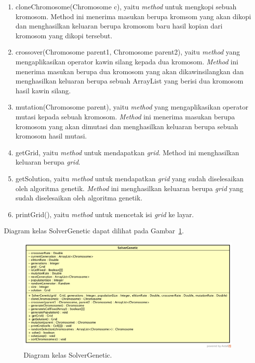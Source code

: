 \begin{enumerate}
\item cloneChromosome(Chromosome c), yaitu \textit{method} untuk mengkopi sebuah kromosom. Method ini menerima masukan berupa kromsom yang akan dikopi dan menghasilkan keluaran berupa kromosom baru hasil kopian dari kromosom yang dikopi tersebut.
\item crossover(Chromosome parent1, Chromosome parent2), yaitu \textit{method} yang mengaplikasikan operator kawin silang kepada dua kromosom. \textit{Method} ini menerima masukan berupa dua kromosom yang akan dikawinsilangkan dan menghasilkan keluaran berupa sebuah ArrayList yang berisi dua kromosom hasil kawin silang.
\item mutation(Chromosome parent), yaitu \textit{method} yang mengaplikasikan operator mutasi kepada sebuah kromosom. \textit{Method} ini menerima masukan berupa kromosom yang akan dimutasi dan menghasilkan keluaran berupa sebuah kromosom hasil mutasi.
\item getGrid, yaitu \textit{method} untuk mendapatkan \textit{grid}. Method ini menghasilkan keluaran berupa \textit{grid}.
\item getSolution, yaitu \textit{method} untuk mendapatkan \textit{grid} yang sudah diselesaikan oleh algoritma genetik. \textit{Method} ini menghasilkan keluaran berupa \textit{grid} yang sudah diselesaikan oleh algoritma genetik.
\item printGrid(), yaitu \textit{method} untuk mencetak isi \textit{grid} ke layar.
\end{enumerate}

Diagram kelas SolverGenetic dapat dilihat pada Gambar~\ref{fig:diagramkelassolvergenetic}.

\begin{figure}
\centering
\captionsetup{justification=centering}
\includegraphics[scale=0.3]{Gambar/Perancangan/DiagramKelasSolverGenetic.png}
\caption[Diagram kelas SolverGenetic.]{Diagram kelas SolverGenetic.}
\label{fig:diagramkelassolvergenetic}
\end{figure}

